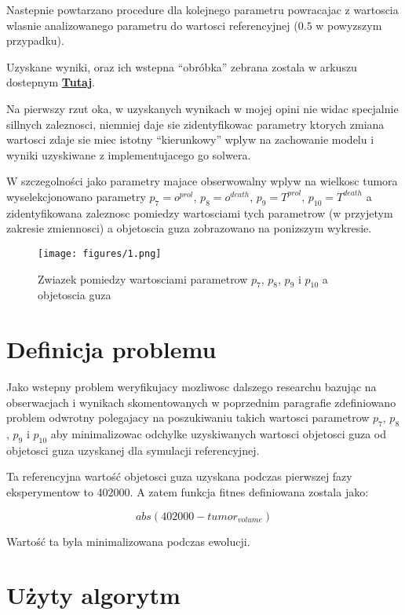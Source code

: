 \documentclass[]{article}
\begin{document}
Nastepnie powtarzano procedure dla kolejnego parametru powracajac z
wartoscia wlasnie analizowanego parametru do wartosci referencyjnej
(\(0.5\) w powyzszym przypadku).

Uzyskane wyniki, oraz ich wstepna ``obróbka'' zebrana zostala w arkuszu
dostepnym
\textbf{\href{http://home.agh.edu.pl/~siwik/tumor/work.ods}{Tutaj}}.

Na pierwszy rzut oka, w uzyskanych wynikach w mojej opini nie widac
specjalnie sillnych zaleznosci, niemniej daje sie zidentyfikowac
parametry ktorych zmiana wartosci zdaje sie miec istotny ``kierunkowy''
wplyw na zachowanie modelu i wyniki uzyskiwane z implementujacego go
solwera.

W szczegolności jako parametry majace obserwowalny wplyw na wielkosc
tumora wyselekcjonowano parametry \(p_7=o^{prol}\), \(p_8=o^{death}\),
\(p_9=T^{prol}\), \(p_{10}=T^{death}\) a zidentyfikowana zaleznosc
pomiedzy wartosciami tych parametrow (w przyjetym zakresie zmiennosci) a
objetoscia guza zobrazowano na ponizszym wykresie.

\begin{figure}[htbp]
\centering
\texttt{[image: figures/1.png]}
\caption{Zwiazek pomiedzy wartosciami parametrow \(p_7\), \(p_8\),
\(p_9\) i \(p_{10}\) a objetoscia guza}
\end{figure}

\section{Definicja problemu}\label{definicja-problemu}

Jako wstepny problem weryfikujacy mozliwosc dalszego researchu bazując
na obserwacjach i wynikach skomentowanych w poprzednim paragrafie
zdefiniowano problem odwrotny polegajacy na poszukiwaniu takich wartosci
parametrow \(p_7\), \(p_8\), \(p_9\) i \(p_{10}\) aby minimalizowac
odchylke uzyskiwanych wartosci objetosci guza od objetosci guza
uzyskanej dla symulacji referencyjnej.

Ta referencyjna wartość objetosci guza uzyskana podczas pierwszej fazy
eksperymentow to 402000. A zatem funkcja fitnes definiowana zostala
jako:

\begin{equation}
abs(402000-tumor_{volume})
 \end{equation}

Wartość ta byla minimalizowana podczas ewolucji.

\section{Użyty algorytm}\label{uux17cyty-algorytm}
\end{document}
